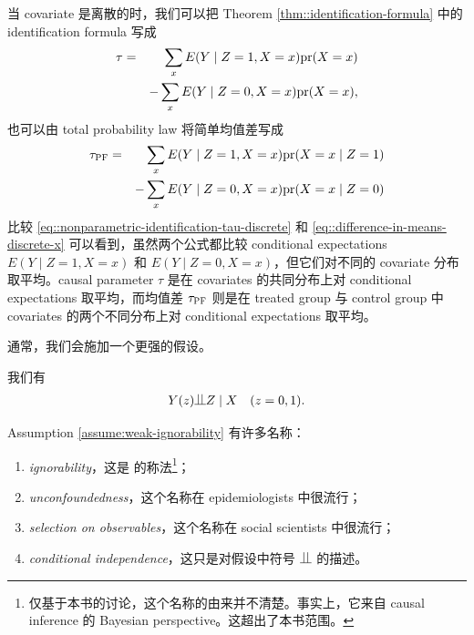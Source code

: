  
 当 covariate 是离散的时，我们可以把 Theorem \ref{thm::identification-formula} 中的 identification formula 写成 
\begin{eqnarray}
 \tau  &=&  \sum_x  E(Y\mid Z=1, X=x)  \textup{pr}(X=x)  \nonumber \\
 &&  - \sum_x E(Y\mid Z=0, X=x) \textup{pr}(X=x), \label{eq::nonparametric-identification-tau-discrete}
\end{eqnarray}
 也可以由 total probability law 将简单均值差写成
  \begin{eqnarray}  
 \tau_\textsc{PF} &=& \sum_x   E(Y\mid Z=1, X=x) \textup{pr}(X=x\mid Z=1) \nonumber  \\
 &&- \sum_x   E(Y\mid Z=0, X=x) \textup{pr}(X=x\mid Z=0)  \label{eq::difference-in-means-discrete-x}
  \end{eqnarray} 
 比较 \eqref{eq::nonparametric-identification-tau-discrete} 和 \eqref{eq::difference-in-means-discrete-x} 可以看到，虽然两个公式都比较 conditional expectations $ E(Y\mid Z=1, X=x) $ 和 $ E(Y\mid Z=0, X=x)$，但它们对不同的 covariate 分布取平均。causal parameter $\tau$ 是在 covariates 的共同分布上对 conditional expectations 取平均，而均值差 $ \tau_\textsc{PF} $ 则是在 treated group 与 control group 中 covariates 的两个不同分布上对 conditional expectations 取平均。 
 
 
 
 通常，我们会施加一个更强的假设。
 
 \begin{assumption}[ignorability]
 \label{assume:weak-ignorability} 
 我们有
 \begin{eqnarray}
 Y(z) \ind Z \mid X \quad (z=0,1) .
 \label{eq::ignorability}
\end{eqnarray}
 \end{assumption}
 
 
Assumption \ref{assume:weak-ignorability} 有许多名称：
\begin{enumerate}
\item
{\it ignorability}，这是 \citet{rubin1978bayesian} 的称法\footnote{仅基于本书的讨论，这个名称的由来并不清楚。事实上，它来自 causal inference 的 Bayesian perspective。这超出了本书范围。}；

\item
{\it unconfoundedness}，这个名称在 epidemiologists 中很流行；

\item
{\it selection on observables}，这个名称在 social scientists 中很流行；

\item
{\it conditional independence}，这只是对假设中符号 $\ind$ 的描述。
\end{enumerate}


